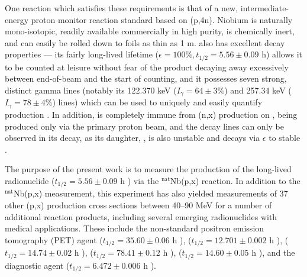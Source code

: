 One  reaction which satisfies these requirements is that of a new, intermediate-energy proton monitor reaction standard based on (p,4n). 
Niobium is naturally mono-isotopic, readily  available commercially in high purity, is chemically inert, and can easily be rolled down to foils as thin as 1 \mmicro m.  
 also has excellent decay properties --- its fairly long-lived lifetime ($\epsilon=100\%, t_{1/2}=5.56 \pm 0.09$ h) allows it to be counted at leisure without fear of the product  decaying away excessively between end-of-beam and the start of counting, and it possesses seven strong, distinct gamma lines (notably its 122.370 keV ($I_\gamma = 64 \pm 3\%$) and 257.34 keV ($I_\gamma = 78 \pm 4\%$) lines) which can be used to uniquely and easily   quantify  production \cite{Browne1997}. 
In addition,   is completely immune from (n,x) production on  , being produced only via the primary proton beam, and the  decay lines can only be observed in its decay, as its daughter, , is also unstable and decays via $\epsilon$ to stable . 
 
The purpose of the present work is to  measure the production of the long-lived radionuclide  ($t_{1/2}=5.56 \pm 0.09$ h \cite{Browne1997}) via the $^\text{nat}$Nb(p,x) reaction. 
In addition to the $^\text{nat}$Nb(p,x) measurement, this experiment has also yielded measurements of 37 other (p,x) production cross sections between 40--90 MeV  for a number of additional reaction products, including several emerging radionuclides with medical applications.
These include the non-standard positron emission tomography (PET) agent   ($t_{1/2}=35.60\pm0.06$ h \cite{Bhat1998}),  ($t_{1/2}=12.701 \pm 0.002$ h \cite{Singh2007}),   ($t_{1/2}=14.74\pm0.02$ h \cite{NEGRET20151}),  ($t_{1/2}=78.41\pm0.12$ h \cite{Singh2013}),   ($t_{1/2}=14.60 \pm 0.05$ h \cite{Browne1997}),  and the diagnostic agent  ($t_{1/2}=6.472\pm0.006$ h \cite{Tuli2003}). 


%   

